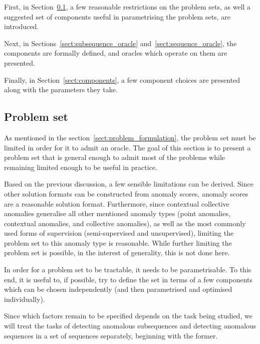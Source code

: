 First, in Section~\ref{sect:problem_set}, a few reasonable restrictions on the problem sets, as well a suggested set of components useful in parametrising the problem sets, are introduced.

Next, in Sections~\ref{sect:subsequence_oracle} and~\ref{sect:sequence_oracle}, the components are formally defined, and oracles which operate on them are presented.

Finally, in Section~\ref{sect:components}, a few component choices are presented along with the parameters they take.

\subsection{Problem set}
\label{sect:problem_set}

As mentioned in the section~\ref{sect:problem_formulation}, the problem set must be limited in order for it to admit an oracle. The goal of this section is to present a problem set that is general enough to admit most of the problems while remaining limited enough to be useful in practice.

Based on the previous discussion, a few sensible limitations can be derived. Since other solution formats can be constructed from anomaly scores, anomaly scores are a reasonable solution format. Furthermore, since contextual collective anomalies generalise all other mentioned anomaly types (point anomalies, contextual anomalies, and collective anomalies), as well as the most commonly used forms of supervision (semi-supervised and unsupervised), limiting the problem set to this anomaly type is reasonable. While further limiting the problem set is possible, in the interest of generality, this is not done here.

In order for a problem set to be tractable, it needs to be parametrisable. To this end, it is useful to, if possible, try to define the set in terms of a few components which can be chosen independently (and then parametrised and optimised individually).

Since which factors remain to be specified depends on the task being studied, we will treat the tasks of detecting anomalous subsequences and detecting anomalous sequences in a set of sequences separately, beginning with the former.

